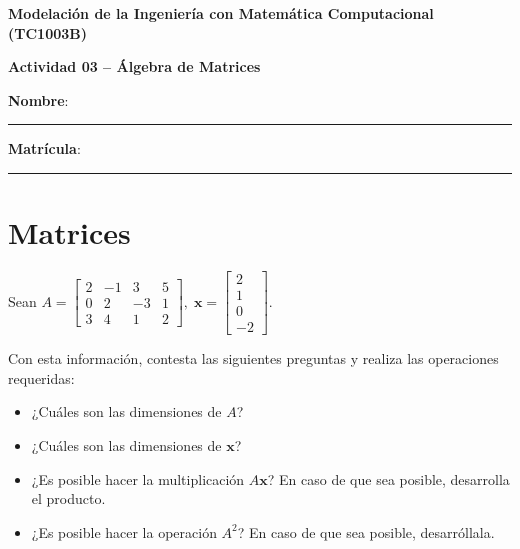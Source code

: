 \documentclass[spanish, 10pt]{article}
\begin{document}
\begin{center}
	{\Large \textbf{Modelación de la Ingeniería con Matemática Computacional (TC1003B)}}
	
	\bigskip
	{\large \textbf{Actividad 03 -- Álgebra de Matrices}}
\end{center}

\bigskip
{\large \textbf{Nombre}: \rule{13.7 cm}{0.4mm}}



\bigskip
{\large \textbf{Matrícula}: \rule{5 cm}{0.4mm}} %

\bigskip


\section{Matrices}

\vspace{3ex}

Sean $A = \begin{bmatrix}
    2 & -1 & 3 & 5 \\
    0 & 2 & -3 & 1 \\
    3 & 4 & 1 & 2
\end{bmatrix}, \;
\mathbf{x} = \begin{bmatrix}    
2 \\ 1 \\ 0 \\ -2
\end{bmatrix}$.

\vspace{3ex}

Con esta información, contesta las siguientes preguntas y realiza las operaciones requeridas:

\begin{itemize}
    \item ¿Cuáles son las dimensiones de $A$?
    \item ¿Cuáles son las dimensiones de $\mathbf{x}$?
    \item ¿Es posible hacer la multiplicación $A\mathbf{x}$? En caso de que sea posible, desarrolla el producto.
    \item ¿Es posible hacer la operación $A^2$? En caso de que sea posible, desarróllala.
\end{itemize}
\end{document}
